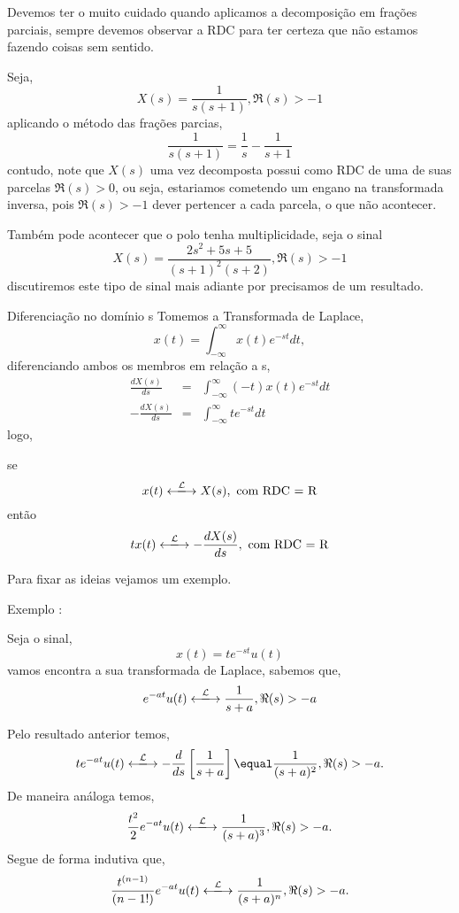 \documentclass[9pt]{beamer}
\begin{document}
 \begin{frame}
   Devemos ter o muito cuidado quando aplicamos a decomposi\c{c}\~{a}o em fra\c{c}\~{o}es parciais, sempre devemos observar a RDC para ter certeza que n\~{a}o estamos fazendo coisas sem sentido.
\par
Seja,
$$ X(s) \equal \frac {1} {s(s + 1)},  \Re (s) > -1$$
aplicando o m\'{e}todo das fra\c{c}\~{o}es parcias, 
$$ \frac {1} {s (s + 1)} \equal \frac {1} {s} - \frac {1} {s + 1} $$
contudo, note que $ X(s)$ uma vez decomposta possui como RDC de uma de suas parcelas $ \Re(s) > 0$, ou seja, estariamos cometendo um engano na transformada inversa, pois $\Re (s) > -1$ dever pertencer a cada parcela,
o que n\~{a}o acontecer.
\par
Tamb\'{e}m pode acontecer que o polo tenha multiplicidade, seja o sinal 
$$ X(s) \equal \frac {2s^2 + 5s + 5} {(s + 1)^2 (s + 2)}, \Re(s) > -1$$ 
discutiremos este tipo de sinal mais adiante por precisamos de  um resultado. 
 \end{frame}
 \begin{frame}{Diferencia\c{c}\~{a}o no dom\'{i}nio s}
Tomemos a Transformada de Laplace,
$$ x(t) \equal \int_{-\infty}^{\infty} x(t) e^{-st} dt, $$
diferenciando ambos os membros em rela\c{c}\~{a}o a s,
\begin{eqnarray}
  \frac {dX(s)} {ds} & \equal &  \int_{- \infty}^{\infty} (-t) x(t) e^{-st} dt \nonumber \\
  -\frac {dX(s)} {ds} & \equal & \int_{- \infty}^{\infty} te^{-st} dt \nonumber
\end{eqnarray}
logo,
\par
\vspace{1.0cm}
\begin{minipage}[!h]{12cm}
  se 
  $$ x(t) \xlongleftrightarrow{\mathcal{L}} X(s), \textrm{ com RDC = R} $$
  ent\~{a}o
  $$ tx(t) \xlongleftrightarrow{\mathcal{L}} -\frac {dX(s)} {ds}, \textrm{ com RDC = R} $$
\end{minipage}
\vspace{0.5cm}
\par
Para fixar as ideias vejamos um exemplo.
 \end{frame}
 \begin{frame}
   Exemplo :
\par
Seja o sinal,
$$ x(t) \equal te^{-st} u(t)$$
vamos encontra a sua transformada de Laplace, sabemos que,
$$ e^{-at} u(t) \xlongleftrightarrow{\mathcal{L}} \frac {1} {s + a}, \Re(s) > -a $$
\par
Pelo resultado anterior temos,
$$ te^{-at} u(t) \xlongleftrightarrow{\mathcal{L}} - \frac {d} {ds}  \left [\frac {1} {s + a} \right]  \equal \frac {1} {(s + a)^2}, \Re (s) > -a.$$
De maneira an\'{a}loga temos,
$$ \frac {t^2} {2} e^{-at} u(t) \xlongleftrightarrow{\mathcal{L}} \frac {1} {(s + a)^3}, \Re (s) > -a.$$
Segue de forma indutiva que,
$$ \frac {t^{(n -1)}} {(n -1!)} e^{-at} u(t) \xlongleftrightarrow{\mathcal{L}} \frac {1} {(s + a)^n}, \Re (s) > -a. $$ 
 \end{frame}
\end{document}
